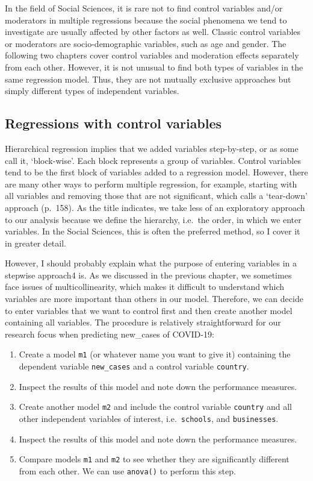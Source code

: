 \documentclass[
]{book}
\providecommand{\tightlist}{%
  \setlength{\itemsep}{0pt}\setlength{\parskip}{0pt}}
\begin{document}
In the field of Social Sciences, it is rare not to find control variables and/or moderators in multiple regressions because the social phenomena we tend to investigate are usually affected by other factors as well. Classic control variables or moderators are socio-demographic variables, such as age and gender. The following two chapters cover control variables and moderation effects separately from each other. However, it is not unusual to find both types of variables in the same regression model. Thus, they are not mutually exclusive approaches but simply different types of independent variables.

\hypertarget{regressions-with-control-variables}{%
\subsection{Regressions with control variables}\label{regressions-with-control-variables}}

Hierarchical regression implies that we added variables step-by-step, or as some call it, `block-wise'. Each block represents a group of variables. Control variables tend to be the first block of variables added to a regression model. However, there are many other ways to perform multiple regression, for example, starting with all variables and removing those that are not significant, which \citet{cohen2014applied} calls a `tear-down' approach (p.~158). As the title indicates, we take less of an exploratory approach to our analysis because we define the hierarchy, i.e.~the order, in which we enter variables. In the Social Sciences, this is often the preferred method, so I cover it in greater detail.

However, I should probably explain what the purpose of entering variables in a stepwise approach4 is. As we discussed in the previous chapter, we sometimes face issues of multicollinearity, which makes it difficult to understand which variables are more important than others in our model. Therefore, we can decide to enter variables that we want to control first and then create another model containing all variables. The procedure is relatively straightforward for our research focus when predicting new\_cases of COVID-19:

\begin{enumerate}
\def\labelenumi{\arabic{enumi}.}
\tightlist
\item
  Create a model \texttt{m1} (or whatever name you want to give it) containing the dependent variable \texttt{new\_cases} and a control variable \texttt{country}.
\item
  Inspect the results of this model and note down the performance measures.
\item
  Create another model \texttt{m2} and include the control variable \texttt{country} and all other independent variables of interest, i.e.~\texttt{schools}, and \texttt{businesses}.
\item
  Inspect the results of this model and note down the performance measures.
\item
  Compare models \texttt{m1} and \texttt{m2} to see whether they are significantly different from each other. We can use \texttt{anova()} to perform this step.
\end{enumerate}
\end{document}

